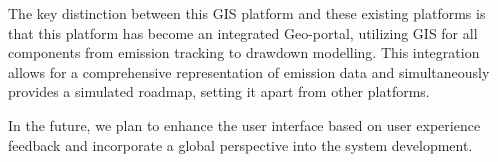 The key distinction between this GIS platform and these existing platforms is that this platform has become an integrated Geo-portal, utilizing GIS for all components from emission tracking to drawdown modelling. This integration allows for a comprehensive representation of emission data and simultaneously provides a simulated roadmap, setting it apart from other platforms.\par
In the future, we plan to enhance the user interface based on user experience feedback and incorporate a global perspective into the system development.\par